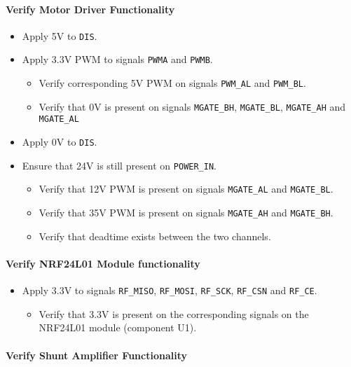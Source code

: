 \paragraph{Verify Motor Driver Functionality} %
\label{par:verify_motor_driver_functionality}
\begin{itemize}
	\item Apply 5V to \texttt{DIS}.
	\item Apply 3.3V PWM to signals \texttt{PWMA} and \texttt{PWMB}.
	\begin{itemize}
		\item Verify corresponding 5V PWM on signals \texttt{PWM\_AL} and \texttt{PWM\_BL}.
		\item Verify that 0V is present on signals \texttt{MGATE\_BH}, \texttt{MGATE\_BL}, \texttt{MGATE\_AH} and \texttt{MGATE\_AL}
	\end{itemize}
	\item Apply 0V to \texttt{DIS}.
	\item Ensure that 24V is still present on \texttt{POWER\_IN}.
	\begin{itemize}
		\item Verify that 12V PWM is present on signals \texttt{MGATE\_AL} and \texttt{MGATE\_BL}.
		\item Verify that 35V PWM is present on signals \texttt{MGATE\_AH} and \texttt{MGATE\_BH}.
		\item Verify that deadtime exists between the two channels.
	\end{itemize}
\end{itemize}
\paragraph{Verify NRF24L01 Module functionality} %
\label{par:verify_nrf24l01_module_functionality}
\begin{itemize}
	\item Apply 3.3V to signals \texttt{RF\_MISO}, \texttt{RF\_MOSI}, \texttt{RF\_SCK}, \texttt{RF\_CSN} and \texttt{RF\_CE}.
	\begin{itemize}
		\item Verify that 3.3V is present on the corresponding signals on the NRF24L01 module (component U1).
	\end{itemize}
\end{itemize}

\paragraph{Verify Shunt Amplifier Functionality} %
\label{par:verify_shunt_amplifier_functionality}

